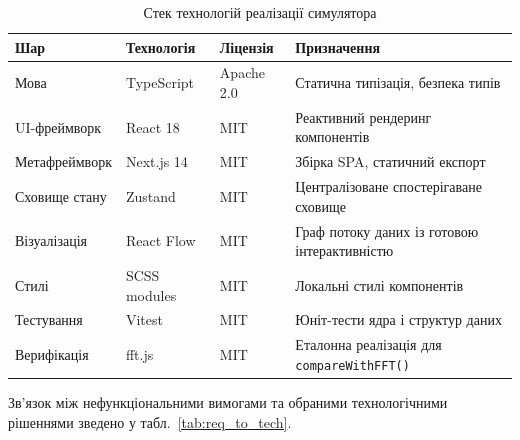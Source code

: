 \documentclass[14pt,a4paper]{extarticle}
\begin{document}
\begin{table}[H]
  \caption{Стек технологій реалізації симулятора}
  \label{tab:tech_stack}
  \centering
  \small
  \begin{tabular}{p{3.0cm}p{3.0cm}p{2.0cm}p{5.5cm}}
    \toprule
    Шар & Технологія & Ліцензія & Призначення \\
    \midrule
    Мова          & TypeScript    & Apache 2.0 & Статична типізація, безпека типів \\
    UI-фреймворк  & React 18      & MIT        & Реактивний рендеринг компонентів \\
    Метафреймворк & Next.js 14    & MIT        & Збірка SPA, статичний експорт \\
    Сховище стану & Zustand       & MIT        & Централізоване спостерігаване сховище \\
    Візуалізація  & React Flow    & MIT        & Граф потоку даних із готовою інтерактивністю \\
    Стилі         & SCSS modules  & MIT        & Локальні стилі компонентів \\
    Тестування    & Vitest        & MIT        & Юніт-тести ядра і структур даних \\
    Верифікація   & fft.js        & MIT        & Еталонна реалізація для \texttt{compareWithFFT()} \\
    \bottomrule
  \end{tabular}
\end{table}

Зв'язок між нефункціональними вимогами та обраними технологічними
рішеннями зведено у табл.~\ref{tab:req_to_tech}.
\end{document}
